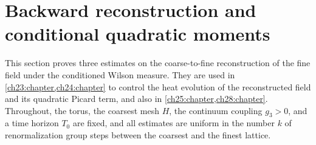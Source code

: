 \chapter{Backward reconstruction and conditional quadratic moments}\label{ch14:chapter}

This section proves three estimates on the coarse-to-fine reconstruction of the fine field under the conditioned Wilson measure. They are used in \cref{ch23:chapter,ch24:chapter} to control the heat evolution of the reconstructed field and its quadratic Picard term, and also in \cref{ch25:chapter,ch28:chapter}. Throughout, the torus, the coarsest mesh $H$, the continuum coupling $g_3>0$, and a time horizon $T_0$ are fixed, and all estimates are uniform in the number $k$ of renormalization group steps between the coarsest and the finest lattice.

